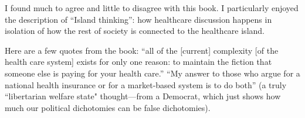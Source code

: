 I found much to agree and little to disagree with this book. I particularly
enjoyed the description of ``Island thinking'': how healthcare discussion
happens in isolation of how the rest of society is connected to the healthcare
island.

Here are a few quotes from the book: ``all of the [current] complexity [of the
health care system] exists for only one reason: to maintain the fiction that
someone else is paying for your health care.'' ``My answer to those who argue
for a national health insurance or for a market-based system is to do both'' (a
truly ``libertarian welfare state" thought---from a Democrat, which just shows
how much our political dichotomies can be false dichotomies).

